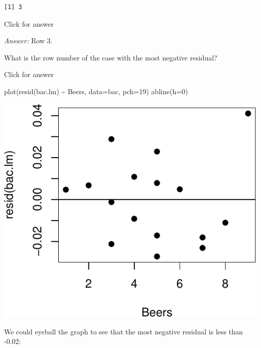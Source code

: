 \documentclass[
]{book}
\newenvironment{Shaded}{\begin{snugshade}}{\end{snugshade}}
\newcommand{\AttributeTok}[1]{\textcolor[rgb]{0.77,0.63,0.00}{#1}}
\newcommand{\DecValTok}[1]{\textcolor[rgb]{0.00,0.00,0.81}{#1}}
\newcommand{\FunctionTok}[1]{\textcolor[rgb]{0.00,0.00,0.00}{#1}}
\newcommand{\NormalTok}[1]{#1}
\newcommand{\SpecialCharTok}[1]{\textcolor[rgb]{0.00,0.00,0.00}{#1}}
\begin{document}
\begin{Shaded}
\end{Shaded}

\begin{verbatim}
[1] 3
\end{verbatim}

Click for answer

\emph{Answer:} Row 3.

What is the row number of the case with the most negative residual?

Click for answer

\begin{Shaded}
\begin{Highlighting}[]
\FunctionTok{plot}\NormalTok{(}\FunctionTok{resid}\NormalTok{(bac.lm) }\SpecialCharTok{\textasciitilde{}}\NormalTok{ Beers, }\AttributeTok{data=}\NormalTok{bac, }\AttributeTok{pch=}\DecValTok{19}\NormalTok{)  }
\FunctionTok{abline}\NormalTok{(}\AttributeTok{h=}\DecValTok{0}\NormalTok{)}
\end{Highlighting}
\end{Shaded}

\includegraphics[width=1\linewidth]{Class_Activity_6_files/figure-latex/unnamed-chunk-14-1}

We could eyeball the graph to see that the most negative residual is less than -0.02:
\end{document}
